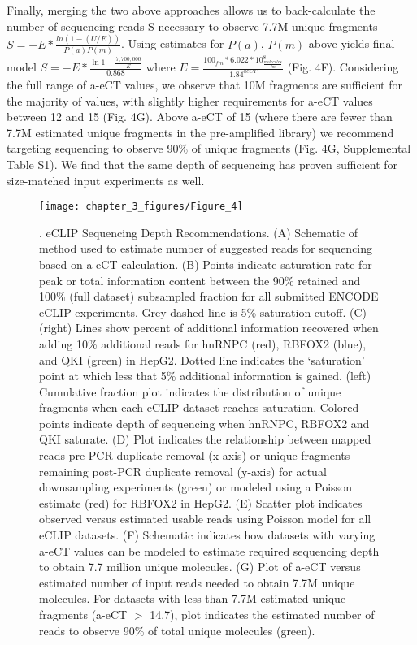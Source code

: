 Finally, merging the two above approaches allows us to back-calculate the number of sequencing reads S necessary to observe 7.7M unique fragments
$S=-E*\frac{ln(1-(U/E))}{P(a)P(m)}$. Using estimates for $P(a)$, $P(m)$ above yields final model $S=-E*\frac{\ln{1-\frac{7,700,000}{E}}}{0.868}$ where $E=\frac{100_{fm}*6.022*10^8_{\frac{molecules}{fm}}}{1.84^{aeCT}}$  (Fig. 4F). Considering the full range of a-eCT values, we observe that 10M fragments are sufficient for the majority of values, with slightly higher requirements for a-eCT values between 12 and 15 (Fig. 4G). Above a-eCT of 15 (where there are fewer than 7.7M estimated unique fragments in the pre-amplified library) we recommend targeting sequencing to observe 90\% of unique fragments (Fig. 4G, Supplemental Table S1). We find that the same depth of sequencing has proven sufficient for size-matched input experiments as well.


\begin{figure}[ht]
  \centering
  \texttt{[image: chapter\_3\_figures/Figure\_4]}
  \caption[Figure 4]{. eCLIP Sequencing Depth Recommendations. (A) Schematic of method used to estimate number of suggested reads for sequencing based on a-eCT calculation. (B) Points indicate saturation rate for peak or total information content between the 90\% retained and 100\% (full dataset) subsampled fraction for all submitted ENCODE eCLIP experiments. Grey dashed line is 5\% saturation cutoff. (C) (right) Lines show percent of additional information recovered when adding 10\% additional reads for hnRNPC (red), RBFOX2 (blue), and QKI (green) in HepG2. Dotted line indicates the ‘saturation’ point at which less that 5\% additional information is gained. (left) Cumulative fraction plot indicates the distribution of unique fragments when each eCLIP dataset reaches saturation. Colored points indicate depth of sequencing when hnRNPC, RBFOX2 and QKI saturate. (D) Plot indicates the relationship between mapped reads pre-PCR duplicate removal (x-axis) or unique fragments remaining post-PCR duplicate removal (y-axis) for actual downsampling experiments (green) or modeled using a Poisson estimate (red) for RBFOX2 in HepG2. (E) Scatter plot indicates observed versus estimated usable reads using Poisson model for all eCLIP datasets. (F) Schematic indicates how datasets with varying a-eCT values can be modeled to estimate required sequencing depth to obtain 7.7 million unique molecules. (G) Plot of a-eCT versus estimated number of input reads needed to obtain 7.7M unique molecules. For datasets with less than 7.7M estimated unique fragments (a-eCT $>$ 14.7), plot indicates the estimated number of reads to observe 90\% of total unique molecules (green). }
  \label{fig:Figure_4}
\end{figure}

